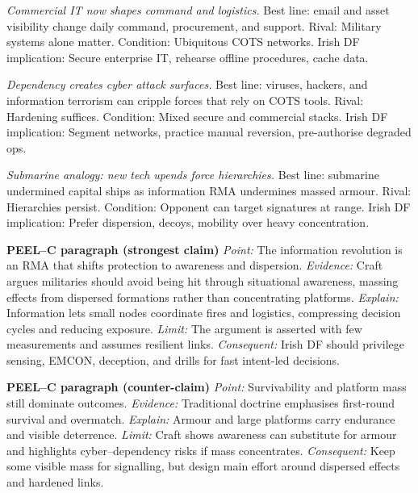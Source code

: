 \textit{Commercial IT now shapes command and logistics.} Best line: email and asset visibility change daily command, procurement, and support. Rival: Military systems alone matter. Condition: Ubiquitous COTS networks. Irish DF implication: Secure enterprise IT, rehearse offline procedures, cache data.

\textit{Dependency creates cyber attack surfaces.} Best line: viruses, hackers, and information terrorism can cripple forces that rely on COTS tools. Rival: Hardening suffices. Condition: Mixed secure and commercial stacks. Irish DF implication: Segment networks, practice manual reversion, pre-authorise degraded ops.

\textit{Submarine analogy: new tech upends force hierarchies.} Best line: submarine undermined capital ships as information RMA undermines massed armour. Rival: Hierarchies persist. Condition: Opponent can target signatures at range. Irish DF implication: Prefer dispersion, decoys, mobility over heavy concentration.

\textbf{PEEL–C paragraph (strongest claim)}
\textit{Point:} The information revolution is an RMA that shifts protection to awareness and dispersion.
\textit{Evidence:} Craft argues militaries should avoid being hit through situational awareness, massing effects from dispersed formations rather than concentrating platforms.
\textit{Explain:} Information lets small nodes coordinate fires and logistics, compressing decision cycles and reducing exposure.
\textit{Limit:} The argument is asserted with few measurements and assumes resilient links.
\textit{Consequent:} Irish DF should privilege sensing, EMCON, deception, and drills for fast intent-led decisions.

\textbf{PEEL–C paragraph (counter-claim)}
\textit{Point:} Survivability and platform mass still dominate outcomes.
\textit{Evidence:} Traditional doctrine emphasises first-round survival and overmatch.
\textit{Explain:} Armour and large platforms carry endurance and visible deterrence.
\textit{Limit:} Craft shows awareness can substitute for armour and highlights cyber–dependency risks if mass concentrates.
\textit{Consequent:} Keep some visible mass for signalling, but design main effort around dispersed effects and hardened links.

